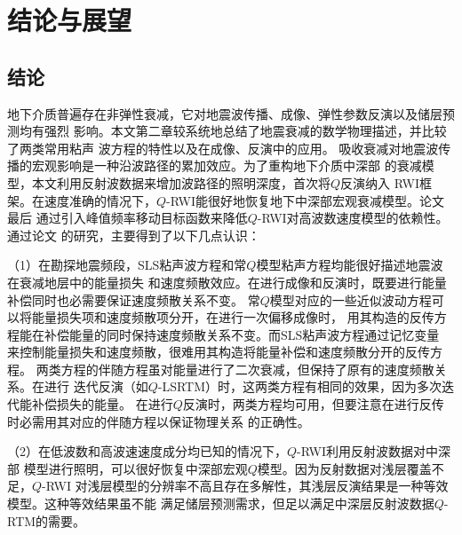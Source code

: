 
%
\newcommand{\backsection}[1]{\vskip 2.8ex
	\begin{flushleft}
		{\zihao{-3}\textbf{#1}}
	\end{flushleft}
	\vskip 0.8ex}


\chapter{结论与展望}
\section{结论}

地下介质普遍存在非弹性衰减，它对地震波传播、成像、弹性参数反演以及储层预测均有强烈
影响。本文第二章较系统地总结了地震衰减的数学物理描述，并比较了两类常用粘声
波方程的特性以及在成像、反演中的应用。
吸收衰减对地震波传播的宏观影响是一种沿波路径的累加效应。为了重构地下介质中深部
的衰减模型，本文利用反射波数据来增加波路径的照明深度，首次将$Q$反演纳入
RWI框架。在速度准确的情况下，$Q$-RWI能很好地恢复地下中深部宏观衰减模型。论文最后
通过引入峰值频率移动目标函数来降低$Q$-RWI对高波数速度模型的依赖性。通过论文
的研究，主要得到了以下几点认识：

（1）在勘探地震频段，SLS粘声波方程和常$Q$模型粘声方程均能很好描述地震波在衰减地层中的能量损失
和速度频散效应。在进行成像和反演时，既要进行能量补偿同时也必需要保证速度频散关系不变。
常$Q$模型对应的一些近似波动方程可以将能量损失项和速度频散项分开，在进行一次偏移成像时，
用其构造的反传方程能在补偿能量的同时保持速度频散关系不变。而SLS粘声波方程通过记忆变量
来控制能量损失和速度频散，很难用其构造将能量补偿和速度频散分开的反传方程。
两类方程的伴随方程虽对能量进行了二次衰减，但保持了原有的速度频散关系。在进行
迭代反演（如$Q$-LSRTM）时，这两类方程有相同的效果，因为多次迭代能补偿损失的能量。
在进行$Q$反演时，两类方程均可用，但要注意在进行反传时必需用其对应的伴随方程以保证物理关系
的正确性。

（2）在低波数和高波速速度成分均已知的情况下，$Q$-RWI利用反射波数据对中深部
模型进行照明，可以很好恢复中深部宏观$Q$模型。因为反射数据对浅层覆盖不足，$Q$-RWI
对浅层模型的分辨率不高且存在多解性，其浅层反演结果是一种等效模型。这种等效结果虽不能
满足储层预测需求，但足以满足中深层反射波数据$Q$-RTM的需要。

